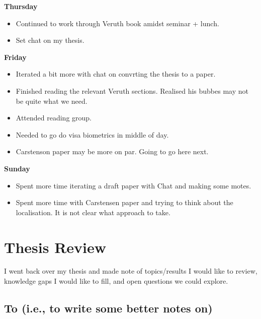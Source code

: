 \documentclass[12pt,a4paper]{article}
\begin{document}
\textbf{Thursday}

\begin{itemize}
    \item Continued to work through Veruth book amidst seminar + lunch.  
    \item Set chat on my thesis.
\end{itemize}

\textbf{Friday}

\begin{itemize}
    \item Iterated a bit more with chat on convrting the thesis to a paper. 
    \item Finished reading the relevant Veruth sections. Realised his bubbes may not be quite what we need. 
    \item Attended reading group. 
    \item Needed to go do visa biometrics in middle of day.
    \item Carstenson paper may be more on par. Going to go here next.
\end{itemize}

\textbf{Sunday}

\begin{itemize}
    \item Spent more time iterating a draft paper with Chat and making some motes.
    \item Spent more time with Carstensen paper and trying to think about the localisation. It is not clear what approach to take. 
\end{itemize}




\section{Thesis Review}

I went back over my thesis and made note of topics/results I would like to review, knowledge gaps I would like to fill, and open questions we could explore. 

\subsection{To  (i.e., to write some better notes on)}
\end{document}
